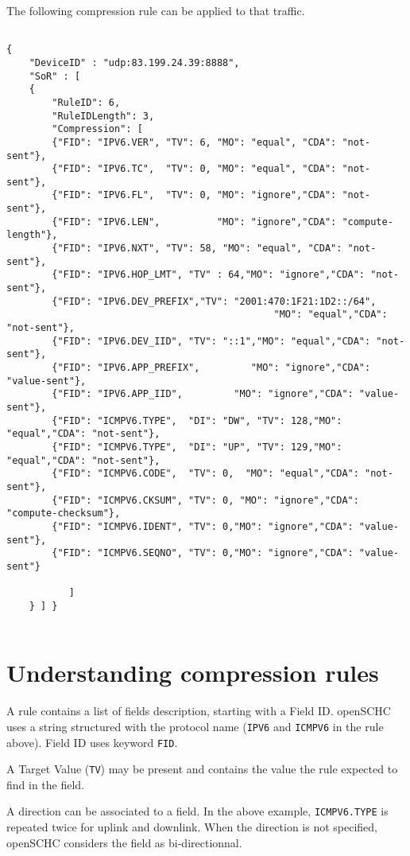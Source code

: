 \documentclass[onecolumn,12pt]{book}
\newcounter{c}
\begin{document}
The following compression rule can be applied to that traffic.

\begin{lstlisting}[basicstyle=\ttfamily\tiny, caption={rule 6/3 for ping traffic}, caption=fig-rule-ping]

{
    "DeviceID" : "udp:83.199.24.39:8888",
    "SoR" : [
	{
	    "RuleID": 6,
	    "RuleIDLength": 3,
	    "Compression": [
		{"FID": "IPV6.VER", "TV": 6, "MO": "equal", "CDA": "not-sent"},
		{"FID": "IPV6.TC",  "TV": 0, "MO": "equal", "CDA": "not-sent"},
		{"FID": "IPV6.FL",  "TV": 0, "MO": "ignore","CDA": "not-sent"},
		{"FID": "IPV6.LEN",          "MO": "ignore","CDA": "compute-length"},
		{"FID": "IPV6.NXT", "TV": 58, "MO": "equal", "CDA": "not-sent"},
		{"FID": "IPV6.HOP_LMT", "TV" : 64,"MO": "ignore","CDA": "not-sent"},
		{"FID": "IPV6.DEV_PREFIX","TV": "2001:470:1F21:1D2::/64",
                                               "MO": "equal","CDA": "not-sent"},
		{"FID": "IPV6.DEV_IID", "TV": "::1","MO": "equal","CDA": "not-sent"},
		{"FID": "IPV6.APP_PREFIX",         "MO": "ignore","CDA": "value-sent"},
		{"FID": "IPV6.APP_IID",         "MO": "ignore","CDA": "value-sent"},
		{"FID": "ICMPV6.TYPE",  "DI": "DW", "TV": 128,"MO": "equal","CDA": "not-sent"},
		{"FID": "ICMPV6.TYPE",  "DI": "UP", "TV": 129,"MO": "equal","CDA": "not-sent"},
		{"FID": "ICMPV6.CODE",  "TV": 0,  "MO": "equal","CDA": "not-sent"},
		{"FID": "ICMPV6.CKSUM", "TV": 0, "MO": "ignore","CDA": "compute-checksum"},
		{"FID": "ICMPV6.IDENT", "TV": 0,"MO": "ignore","CDA": "value-sent"},
		{"FID": "ICMPV6.SEQNO", "TV": 0,"MO": "ignore","CDA": "value-sent"}
		
	       ]
	} ] }
	
\end{lstlisting}

\section{Understanding compression rules}

A rule contains a list of fields description, starting with a Field ID. openSCHC uses a string structured with the protocol name (\texttt{IPV6} and \texttt{ICMPV6} in the rule above). Field ID uses keyword \texttt{FID}.

A Target Value (\texttt{TV}) may be present and contains the value the rule expected to find in the field.

A direction can be associated to a field. In the above example, \texttt{ICMPV6.TYPE} is repeated twice for uplink and downlink. When the direction is not specified, openSCHC considers the field as bi-directionnal.
\end{document}

